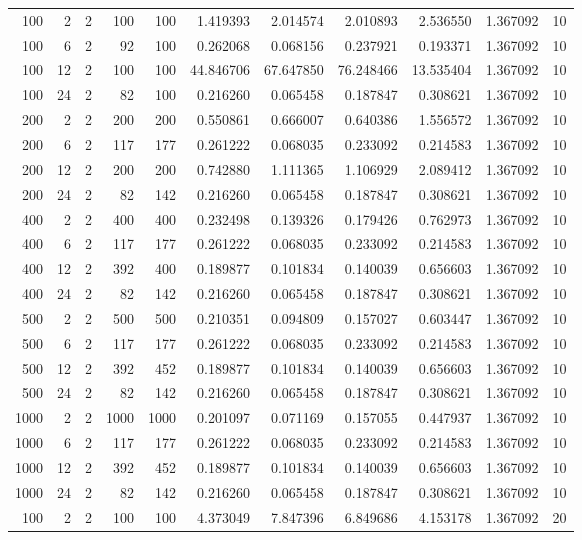 \begin{table}
\begin{tabular}{rrrrrrrrrrr}
100 & 2 & 2 & 100 & 100 & 1.419393 & 2.014574 & 2.010893 & 2.536550 & 1.367092 & 10 \\
100 & 6 & 2 & 92 & 100 & 0.262068 & 0.068156 & 0.237921 & 0.193371 & 1.367092 & 10 \\
100 & 12 & 2 & 100 & 100 & 44.846706 & 67.647850 & 76.248466 & 13.535404 & 1.367092 & 10 \\
100 & 24 & 2 & 82 & 100 & 0.216260 & 0.065458 & 0.187847 & 0.308621 & 1.367092 & 10 \\
200 & 2 & 2 & 200 & 200 & 0.550861 & 0.666007 & 0.640386 & 1.556572 & 1.367092 & 10 \\
200 & 6 & 2 & 117 & 177 & 0.261222 & 0.068035 & 0.233092 & 0.214583 & 1.367092 & 10 \\
200 & 12 & 2 & 200 & 200 & 0.742880 & 1.111365 & 1.106929 & 2.089412 & 1.367092 & 10 \\
200 & 24 & 2 & 82 & 142 & 0.216260 & 0.065458 & 0.187847 & 0.308621 & 1.367092 & 10 \\
400 & 2 & 2 & 400 & 400 & 0.232498 & 0.139326 & 0.179426 & 0.762973 & 1.367092 & 10 \\
400 & 6 & 2 & 117 & 177 & 0.261222 & 0.068035 & 0.233092 & 0.214583 & 1.367092 & 10 \\
400 & 12 & 2 & 392 & 400 & 0.189877 & 0.101834 & 0.140039 & 0.656603 & 1.367092 & 10 \\
400 & 24 & 2 & 82 & 142 & 0.216260 & 0.065458 & 0.187847 & 0.308621 & 1.367092 & 10 \\
500 & 2 & 2 & 500 & 500 & 0.210351 & 0.094809 & 0.157027 & 0.603447 & 1.367092 & 10 \\
500 & 6 & 2 & 117 & 177 & 0.261222 & 0.068035 & 0.233092 & 0.214583 & 1.367092 & 10 \\
500 & 12 & 2 & 392 & 452 & 0.189877 & 0.101834 & 0.140039 & 0.656603 & 1.367092 & 10 \\
500 & 24 & 2 & 82 & 142 & 0.216260 & 0.065458 & 0.187847 & 0.308621 & 1.367092 & 10 \\
1000 & 2 & 2 & 1000 & 1000 & 0.201097 & 0.071169 & 0.157055 & 0.447937 & 1.367092 & 10 \\
1000 & 6 & 2 & 117 & 177 & 0.261222 & 0.068035 & 0.233092 & 0.214583 & 1.367092 & 10 \\
1000 & 12 & 2 & 392 & 452 & 0.189877 & 0.101834 & 0.140039 & 0.656603 & 1.367092 & 10 \\
1000 & 24 & 2 & 82 & 142 & 0.216260 & 0.065458 & 0.187847 & 0.308621 & 1.367092 & 10 \\
100 & 2 & 2 & 100 & 100 & 4.373049 & 7.847396 & 6.849686 & 4.153178 & 1.367092 & 20 \\

\end{tabular}
\end{table}
